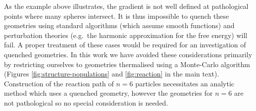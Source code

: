 \documentclass[11pt,twoside]{report}
\def\includebibliography{}
\begin{document}
As the example above illustrates, the gradient is not well defined at pathological points where many spheres intersect.
It is thus impossible to quench these geometries using standard algorithms (which assume smooth functions) and perturbation theories (e.g.\ the harmonic approximation for the free energy) will fail.
A proper treatment of these cases would be required for an investigation of quenched geometries.
In this work we have avoided these considerations primarily by restricting ourselves to geometries thermalised using a Monte-Carlo algorithm (Figures \ref{fig:structure-populations} and \ref{fig:reaction} in the main text).
Construction of the reaction path of $n=6$ particles necessitates an analytic method which uses a quenched geometry, however the geometries for $n=6$ are not pathological so no special consideration is needed.

\ifdefined\includebibliography
  \printbibliography
\fi
\end{document}
